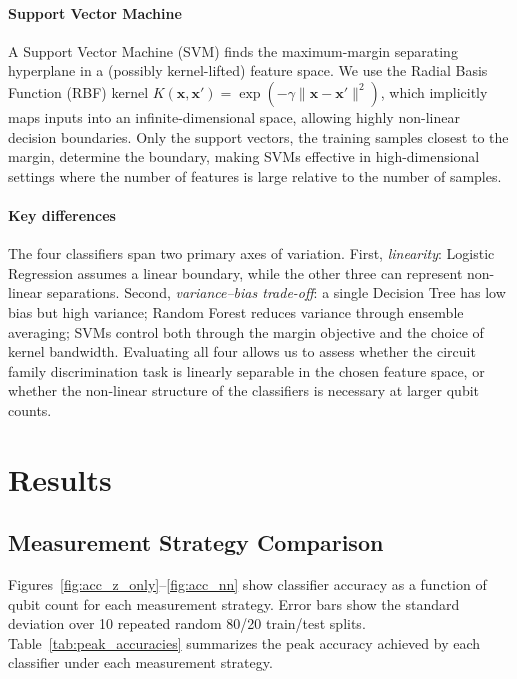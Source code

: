 \documentclass[conference]{IEEEtran}
\begin{document}
\paragraph{Support Vector Machine}
A Support Vector Machine (SVM) finds the maximum-margin separating hyperplane in a (possibly kernel-lifted) feature space.
We use the Radial Basis Function (RBF) kernel $K(\mathbf{x}, \mathbf{x}') = \exp(-\gamma\|\mathbf{x}-\mathbf{x}'\|^2)$, which implicitly maps inputs into an infinite-dimensional space, allowing highly non-linear decision boundaries.
Only the support vectors, the training samples closest to the margin, determine the boundary, making SVMs effective in high-dimensional settings where the number of features is large relative to the number of samples.

\paragraph{Key differences}
The four classifiers span two primary axes of variation.
First, \emph{linearity}: Logistic Regression assumes a linear boundary, while the other three can represent non-linear separations.
Second, \emph{variance--bias trade-off}: a single Decision Tree has low bias but high variance; Random Forest reduces variance through ensemble averaging; SVMs control both through the margin objective and the choice of kernel bandwidth.
Evaluating all four allows us to assess whether the circuit family discrimination task is linearly separable in the chosen feature space, or whether the non-linear structure of the classifiers is necessary at larger qubit counts.

\section{Results}
\label{sec:results}

\subsection{Measurement Strategy Comparison}

Figures~\ref{fig:acc_z_only}--\ref{fig:acc_nn} show classifier accuracy as a function 
of qubit count for each measurement strategy. Error bars show the standard deviation 
over 10 repeated random 80/20 train/test splits. Table~\ref{tab:peak_accuracies} 
summarizes the peak accuracy achieved by each classifier under each measurement strategy.
\end{document}
